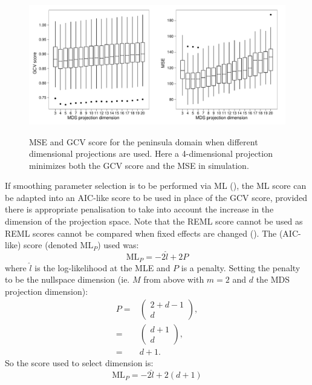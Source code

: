 \begin{figure}
\centering
\includegraphics[width=6in]{mds/figs/wt2-gcv-projdim-boxplot.pdf} \\
\caption{MSE and GCV score for the peninsula domain when different dimensional projections are used. Here a 4-dimensional projection minimizes both the GCV score and the MSE in simulation.}
\label{wt2-gcv-projdim-boxplot}
\end{figure}

If smoothing parameter selection is to be performed via ML (), the ML score can be adapted into an AIC-like score to be used in place of the GCV score, provided there is appropriate penalisation to take into account the increase in the dimension of the projection space. Note that the REML score cannot be used as REML scores cannot be compared when fixed effects are changed (\cite{remlpaper}). The (AIC-like) score (denoted $\text{ML}_P$) used was:
\begin{equation*}
\text{ML}_P = -2 \hat{l} + 2P
\end{equation*}
where $\hat{l}$ is the log-likelihood at the MLE and $P$ is a penalty. Setting the penalty to be the nullspace dimension (ie. $M$ from above with $m=2$ and $d$ the MDS projection dimension):
\begin{align*}
P =& \begin{pmatrix} 2+d-1 \\ d  \end{pmatrix},\\
=& \begin{pmatrix} d+1 \\ d  \end{pmatrix},\\
=& d+1.
\end{align*}
So the score used to select dimension is:
\begin{equation*}
\text{ML}_P = -2 \hat{l} + 2(d+1)
\end{equation*}

